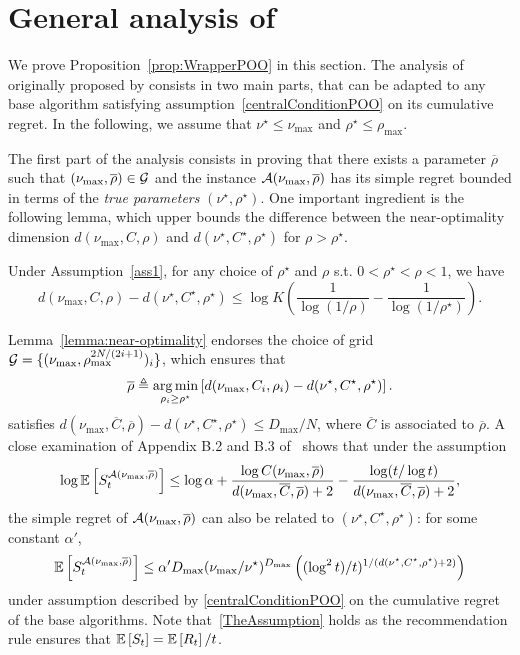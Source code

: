 \section{General analysis of \POO}\label{app:gpo.poo}

We prove Proposition~\ref{prop:WrapperPOO} in this section. The analysis of \POO originally proposed by \cite{grill2015poo} consists in two main parts, that can be adapted to any base algorithm satisfying assumption~\eqref{centralConditionPOO} on its cumulative regret. In the following, we assume that $\nu^\star \leq \nu_{\max}$ and $\rho^\star \leq \rho_{\max}$. 

The first part of the analysis consists in proving that there exists a parameter $\overline{\rho}$ such that $(\nu_{\max},\overline{\rho}) \in \mathcal{G}$ and the instance $\mathcal{A}(\nu_{\max},\overline{\rho})$ has its simple regret bounded in terms of the \emph{true parameters} $(\nu^\star,\rho^\star)$.  One important ingredient is the following lemma, which upper bounds the difference between the near-optimality dimension $d(\nu_{\max},C,\rho)$ and $d(\nu^\star,C^\star,\rho^\star)$ for $\rho > \rho^\star$. 
\begin{lemma}\label{lemma:near-optimality}
	Under Assumption~\ref{ass1}, for any choice of $\rho^\star$ and $\rho$ s.t. $0<\rho^\star<\rho<1$, we have
	\[
		d(\nu_{\max},C,\rho) - d(\nu^\star,C^\star,\rho^\star) \leq \log K \left(\frac{1}{\log(1/\rho)} - \frac{1}{\log(1/\rho^\star)}\right)\!.	
	\]	
\end{lemma}
Lemma~\ref{lemma:near-optimality} endorses the choice of grid $\mathcal{G} = \{(\nu_{\max},\rho_{\max}^{2N/(2i+1)})_i\}$, which ensures that 
\[
	\overline{\rho} \triangleq \underset{\rho_i\geq\rho^\star}{\operatorname*{arg\,min}} \left[d(\nu_{\max},C_i,\rho_i) - d(\nu^\star,C^\star,\rho^\star)\right].
\]
satisfies $d(\nu_{\max},\overline{C},\overline{\rho}) - d(\nu^\star,C^\star,\rho^\star) \leq D_{\max}/N$, where $\overline{C}$ is associated to $\overline{\rho}$. A close examination of Appendix B.2 and B.3 of~\cite{grill2015poo} shows that under the assumption  
\begin{equation}\label{TheAssumption}
    \log \mathbb{E}\left[S_t^{\mathcal{A}(\nu_{\max},\overline{\rho})}\right] \leq \log\alpha + \frac{\log C(\nu_{\max},\overline{\rho})}{d(\nu_{\max},\overline{C},\overline{\rho})+2} - \frac{\log(t/\log t)}{d(\nu_{\max},\overline{C},\overline{\rho})+2},
\end{equation}
the simple regret of $\mathcal{A}(\nu_{\max},\overline{\rho})$ can also be related to $(\nu^\star,C^\star,\rho^\star)$: for some constant $\alpha'$, 
\begin{equation}\label{THEBound}\mathbb{E}\left[S_t^{\mathcal{A}(\nu_{\max},\overline{\rho})}\right] \leq \alpha' D_{\max}(\nu_{\max}/\nu^\star)^{D_{\max}} \left( (\log^2 t)/t)^{1/(d(\nu^\star,C^\star,\rho^\star)+2)} \right)\end{equation}
under assumption described by \eqref{centralConditionPOO} on the cumulative regret of the base algorithms. Note that~\eqref{TheAssumption} holds as the recommendation rule ensures that $\mathbb{E}\left[S_t\right]=\mathbb{E}\left[R_t\right]/t$.  

